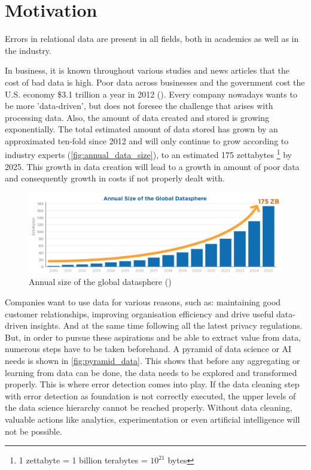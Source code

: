 \section{Motivation}
\label{sec:motivation}
Errors in relational data are present in all fields, both in academics as well as in the industry. 

In business, it is known throughout various studies and news articles that the cost of bad data is high. Poor data across businesses and the government cost the U.S. economy \$3.1 trillion a year in 2012 (\cite{Ilyas2015-oh}). Every company nowadays wants to be more 'data-driven', but does not foresee the challenge that arises with processing data. Also, the amount of data created and stored is growing exponentially. The total estimated amount of data stored has grown by an approximated ten-fold since 2012 and will only continue to grow according to industry experts (\autoref{fig:annual_data_size}), to an estimated 175 zettabytes \footnote{1 zettabyte = 1 billion terabytes = $10^{21}$ bytes} by 2025. This growth in data creation will lead to a growth in amount of poor data and consequently growth in costs if not properly dealt with. 

\begin{figure}
    \centering
    \includegraphics[width=\textwidth]{thesis/Figures/AnnualDataSize.png}
    \caption{Annual size of the global datasphere (\cite{Rydning2018-mt})}
    \label{fig:annual_data_size}
\end{figure}

Companies want to use data for various reasons, such as: maintaining good customer relationships, improving organisation efficiency and drive useful data-driven insights. And at the same time following all the latest privacy regulations.  
But, in order to pursue these aspirations and be able to extract value from data, numerous steps have to be taken beforehand. A pyramid of data science or AI needs is shown in \autoref{fig:pyramid_data}. This shows that before any aggregating or learning from data can be done, the data needs to be explored and transformed properly. This is where error detection comes into play. If the data cleaning step with error detection as foundation is not correctly executed, the upper levels of the data science hierarchy cannot be reached properly. Without data cleaning, valuable actions like analytics, experimentation or even artificial intelligence will not be possible.

